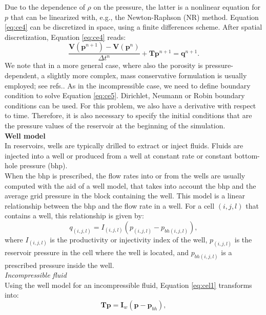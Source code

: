 \documentclass[12pt]{article}
\begin{document}
Due to the dependence of $\rho$ on the pressure, the latter is a nonlinear equation for $p$ that can be linearized with, e.g., the Newton-Raphson (NR) method.
Equation \eqref{eq:ce4} can be discretized in space, using a finite differences scheme. After spatial discretization, Equation \eqref{eq:ce4} reads:
\begin{equation}\label{eq:ce5}
\frac{\mathbf{V}(\mathbf{{p}}^{n+1})-\mathbf{V}(\mathbf{{p}}^{n})}{\Delta t^n}+\mathbf{T}\mathbf{p}^{n+1}=\mathbf{q}^{n+1}.
\end{equation}
We note that in a more general case, where also the porosity is pressure-dependent, a slightly more complex, mass conservative formulation is usually employed; see refs.\cite{Aziz79,Chen06,Jansen13}. As in the incompressible case, we need to define boundary condition to solve Equation \eqref{eq:ce5}. Dirichlet, Neumann or Robin boundary conditions can be used. For this problem, we also have a derivative with respect to time. Therefore, it is also necessary to specify the initial conditions that are the pressure values of the reservoir at the beginning of the simulation.\\
\textbf{Well model}\\
In reservoirs, wells are typically drilled to extract or inject fluids. Fluids are injected into a well or produced from a well at constant rate or constant bottom-hole pressure (bhp).\\
 When the bhp is prescribed, the flow rates into or from the wells are usually computed with the aid of a well model, that takes into account the bhp and the average grid pressure in the block containing the well. 
This model is a linear relationship between the bhp and the flow rate in a well. For a cell $(i,j,l)$ that contains a well, this relationship is given by:
\begin{equation}\label{eq:wellm}
{q}_{(i,j,l)}={I}_{(i,j,l)}({p}_{(i,j,l)}-{p}_{bh(i,j,l)}),
\end{equation}
where ${I}_{(i,j,l)}$ is the productivity or injectivity index of the well, ${p}_{(i,j,l)}$ is the reservoir pressure in the cell 
where the well is located, 
and ${p}_{bh(i,j,l)}$ is a prescribed pressure inside the well. \\
\emph{Incompressible fluid}\\
Using the well model for an incompressible fluid, Equation \eqref{eq:cel1} transforms into:
 \begin{equation}\label{eq:celw1}
\mathbf{T}\mathbf{p} = \mathbf{I}_w(\mathbf{p}-\mathbf{p}_{bh}),
\end{equation}
\end{document}
